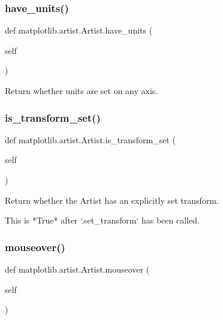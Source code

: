 \subsubsection{\texorpdfstring{have\+\_\+units()}{have\_units()}}
{\footnotesize\ttfamily def matplotlib.\+artist.\+Artist.\+have\+\_\+units (\begin{DoxyParamCaption}\item[{}]{self }\end{DoxyParamCaption})}

\begin{DoxyVerb}Return whether units are set on any axis.\end{DoxyVerb}
 \mbox{\label{classmatplotlib_1_1artist_1_1Artist_acdf01ea328fa4a255021e47ee118f6aa}} 
\subsubsection{\texorpdfstring{is\+\_\+transform\+\_\+set()}{is\_transform\_set()}}
{\footnotesize\ttfamily def matplotlib.\+artist.\+Artist.\+is\+\_\+transform\+\_\+set (\begin{DoxyParamCaption}\item[{}]{self }\end{DoxyParamCaption})}

\begin{DoxyVerb}Return whether the Artist has an explicitly set transform.

This is *True* after `.set_transform` has been called.
\end{DoxyVerb}
 \mbox{\label{classmatplotlib_1_1artist_1_1Artist_aed89cc5afc1b370f92efd96b969b6c89}} 
\subsubsection{\texorpdfstring{mouseover()}{mouseover()}\hspace{0.1cm}{\footnotesize\ttfamily [1/2]}}
{\footnotesize\ttfamily def matplotlib.\+artist.\+Artist.\+mouseover (\begin{DoxyParamCaption}\item[{}]{self }\end{DoxyParamCaption})}

